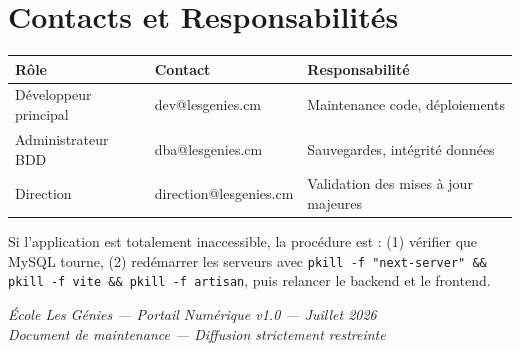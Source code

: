 \documentclass[12pt,a4paper]{report}
\begin{document}
\chapter{Contacts et Responsabilités}

\begin{tabularx}{\textwidth}{llX}\toprule
\textbf{Rôle} & \textbf{Contact} & \textbf{Responsabilité} \\\midrule
Développeur principal & dev@lesgenies.cm & Maintenance code, déploiements \\
Administrateur BDD & dba@lesgenies.cm & Sauvegardes, intégrité données \\
Direction           & direction@lesgenies.cm & Validation des mises à jour majeures \\
\bottomrule\end{tabularx}

\vspace{1cm}
\begin{tipbox}
Si l'application est totalement inaccessible, la procédure est : (1) vérifier que MySQL tourne, (2) redémarrer les serveurs avec \texttt{pkill -f "next-server" \&\& pkill -f vite \&\& pkill -f artisan}, puis relancer le backend et le frontend.
\end{tipbox}

\vfill
\begin{center}
  \color{gray}\small\textit{École Les Génies — Portail Numérique v1.0 — Juillet 2026}\\
  \textit{Document de maintenance — Diffusion strictement restreinte}
\end{center}
\end{document}
